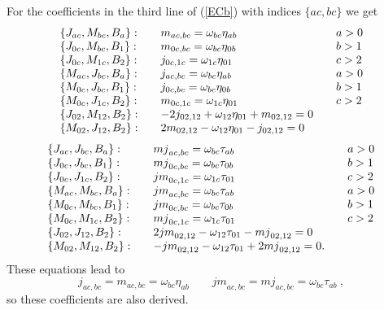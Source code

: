 \documentclass[12pt]{article}
\begin{document}
For the coefficients in the third line of (\ref{ECb}) with indices
$\{ac,bc\}$ we get
\begin{equation}
\begin{array}{lll}
\{{J}_{ac},{M}_{bc},{B}_{a}\}:&
\quad {m}_{ac,bc}={\omega}_{bc}{\eta}_{ab}&\quad a>0
\cr
\{{J}_{0c},{M}_{bc},{B}_{1}\}:&\quad{m}_{0c,bc}={\omega}_{bc}{\eta}_{0b}&\quad
b>1\cr
\{{J}_{0c},{M}_{1c},{B}_{2}\}:
&\quad{j}_{0c,1c}={\omega}_{1c}{\eta}_{01}&\quad
c>2\cr
 \{{M}_{ac},{J}_{bc},{B}_{a}\}:&
\quad{j}_{ac,bc}={\omega}_{bc}{\eta}_{ab}&\quad a>0
\cr
\{{M}_{0c},{J}_{bc},{B}_{1}\}:&\quad{j}_{0c,bc}={\omega}_{bc}{\eta}_{0b}&\quad
b>1\cr
\{{M}_{0c},{J}_{1c},{B}_{2}\}:&\quad{m}_{0c,1c}={\omega}_{1c}{\eta}_{01}
&\quad c>2\cr
\{{J}_{02},{M}_{12},{B}_{2}\}:&\quad
-2 {j}_{02,12}+{\omega}_{12}{\eta}_{01}
+{m}_{02,12}=0\cr
\{{M}_{02},{J}_{12},{B}_{2}\}: &\quad
  2{m}_{02,12}-{\omega}_{12}{\eta}_{01}
-{j}_{02,12}=0
\end{array}
\label{cm}
\end{equation}
\begin{equation}
\begin{array}{lll}
\{{J}_{ac},{J}_{bc},{B}_{a}\}:&\quad {mj}_{ac,bc}=
{\omega}_{bc}{\tau}_{ab}&\quad a>0
\cr
\{{J}_{0c},{J}_{bc},{B}_{1}\}:&\quad{mj}_{0c,bc}={\omega}_{bc}{\tau}_{0b}&\quad
b>1\cr
\{{J}_{0c},{J}_{1c},{B}_{2}\}:
&\quad{jm}_{0c,1c}={\omega}_{1c}{\tau}_{01}&\quad
c>2\cr
 \{{M}_{ac},{M}_{bc},{B}_{a}\}:&\quad{jm}_{ac,bc}=
{\omega}_{bc}{\tau}_{ab}&\quad a>0
\cr
\{{M}_{0c},{M}_{bc},{B}_{1}\}:&\quad{jm}_{0c,bc}={\omega}_{bc}{\tau}_{0b}&\quad
b>1\cr
\{{M}_{0c},{M}_{1c},{B}_{2}\}:&\quad{mj}_{0c,1c}={\omega}_{1c}{\tau}_{01}
&\quad c>2\cr
\{{J}_{02},{J}_{12},{B}_{2}\}:&\quad
2 {jm}_{02,12} - {\omega}_{12}{\tau}_{01}
- {mj}_{02,12}=0\cr
\{{M}_{02},{M}_{12},{B}_{2}\}: &\quad
  - {jm}_{02,12}-{\omega}_{12}{\tau}_{01}
+2{mj}_{02,12}=0 .
\end{array}
\label{cn}
\end{equation}
These equations lead to
\begin{equation}
{j}_{ac,bc}={m}_{ac,bc}={\omega}_{bc}{\eta}_{ab} \qquad
{jm}_{ac,bc}={mj}_{ac,bc}={\omega}_{bc}{\tau}_{ab}\ ,
\label{co}
\end{equation}
so these coefficients are also derived.
\end{document}
